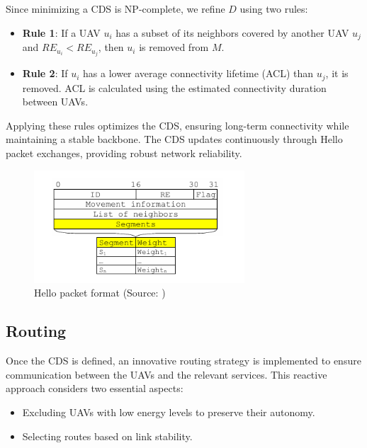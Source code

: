 Since minimizing a CDS is NP-complete, we refine \( D \) using two rules:
\begin{itemize}
    \item \textbf{Rule 1}: If a UAV \( u_i \) has a subset of its neighbors covered by another UAV \( u_j \) and \( RE_{u_i} < RE_{u_j} \), then \( u_i \) is removed from \( M \).
    \item \textbf{Rule 2}: If \( u_i \) has a lower average connectivity lifetime (ACL) than \( u_j \), it is removed. ACL is calculated using the estimated connectivity duration between UAVs.
\end{itemize}

Applying these rules optimizes the CDS, ensuring long-term connectivity while maintaining a stable backbone. The CDS updates continuously through Hello packet exchanges, providing robust network reliability.

\begin{figure}[H]
    \centering
    \includegraphics[width=0.7\textwidth]{Figures/Chapter3/Method5/2.png}
    \caption{Hello packet format (Source: \cite{oubbati2019leveraging})}
    \label{fig:Hello_packet_format}
\end{figure}

\vspace{\baselineskip} %

\subsection{Routing}
Once the CDS is defined, an innovative routing strategy is implemented to ensure communication between the UAVs and the relevant services. This reactive approach considers two essential aspects:
\begin{itemize}
    \item Excluding UAVs with low energy levels to preserve their autonomy.
    \item Selecting routes based on link stability.
\end{itemize}


